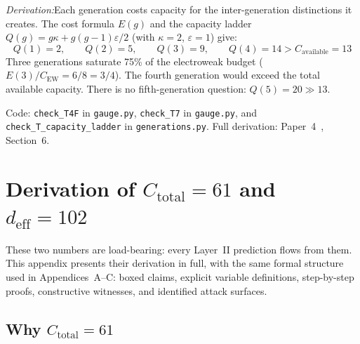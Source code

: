 \documentclass[11pt]{article}
\newcommand{\eps}{\varepsilon}
\begin{document}
\textit{Derivation:}\quad Each generation costs capacity for the inter-generation distinctions it creates.  The cost formula $E(g)$ and the capacity ladder $Q(g) = g\kappa + g(g-1)\eps/2$ (with $\kappa = 2$, $\eps = 1$) give:
\begin{equation}
Q(1) = 2, \qquad Q(2) = 5, \qquad Q(3) = 9, \qquad Q(4) = 14 > C_{\mathrm{available}} = 13
\end{equation}
Three generations saturate 75\% of the electroweak budget ($E(3)/C_{\mathrm{EW}} = 6/8 = 3/4$).  The fourth generation would exceed the total available capacity.  There is no fifth-generation question: $Q(5) = 20 \gg 13$.

Code: \texttt{check\_T4F} in \texttt{gauge.py}, \texttt{check\_T7} in \texttt{gauge.py}, and \texttt{check\_T\_capacity\_ladder} in \texttt{generations.py}.  Full derivation: Paper~4~\cite{P4}, Section~6.


\section{Derivation of \texorpdfstring{$C_{\mathrm{total}} = 61$}{Ctotal = 61} and \texorpdfstring{$d_{\mathrm{eff}} = 102$}{deff = 102}}

These two numbers are load-bearing: every Layer~II prediction flows from them.  This appendix presents their derivation in full, with the same formal structure used in Appendices~A--C: boxed claims, explicit variable definitions, step-by-step proofs, constructive witnesses, and identified attack surfaces.


\subsection{Why \texorpdfstring{$C_{\mathrm{total}} = 61$}{Ctotal = 61}}
\end{document}
